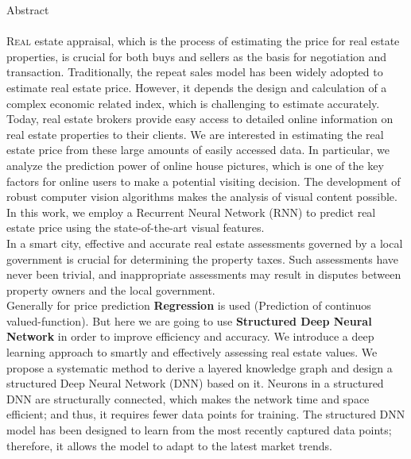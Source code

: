 \documentclass[11pt,fleqn]{book} %
\begin{document}
\newpage
\bfseries \fontsize{15}{19} \normalfont \centerline{\LARGE\color{ocre} Abstract} 
			          \pagestyle{empty}
			         {\setlength{\baselineskip}{1\baselineskip}
			         
\paragraph*{}\lettrine[lines=2]{\color{ocre!60} R}{eal} estate appraisal, which is the process of estimating the price for real estate properties, is crucial for both buys and sellers as the basis for negotiation and transaction. Traditionally, the repeat sales model has been widely adopted to estimate real estate price. However, it depends the design and calculation of a complex economic related index, which is challenging to estimate accurately. Today, real estate brokers provide easy access to detailed online information on real estate properties to their clients. We are interested in estimating the real estate price from these large amounts of easily accessed data. In particular, we analyze the prediction power of online house pictures, which is one of the key factors for online users to make a potential visiting decision. The development of robust computer vision algorithms makes the analysis of visual content possible. In this work, we employ a Recurrent Neural Network (RNN) to predict real estate price using the state-of-the-art visual features.\\
In a smart city, effective and accurate real estate assessments governed by a local government is crucial for determining the property taxes. Such assessments have never been trivial, and inappropriate assessments may result in disputes between property owners and the local government.\\
Generally for price prediction \textbf{\color{ocre} Regression} is used (Prediction of continuos valued-function). But here we are going to use \textbf{\color{ocre} Structured Deep Neural Network} in order to improve efficiency and accuracy. We introduce a deep learning approach to smartly and effectively assessing real estate values. We propose a systematic method to derive a layered knowledge graph and design a structured Deep Neural Network (DNN) based on it. Neurons in a structured DNN are structurally connected, which makes the network time and space efficient; and thus, it requires fewer data points for training. The structured DNN model has been designed to learn from the most recently captured data points; therefore, it allows the model to adapt to the latest market trends.

			         }
\end{document}
